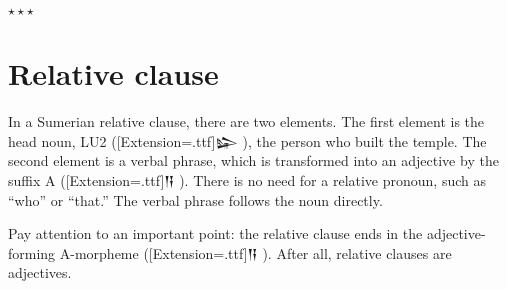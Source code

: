 \documentclass[a4paper,12pt]{book}
\newcommand*\sepstars{%
  \begin{center}
    $\star\star\star$
\end{center}}
\newcommand{\fcn}{\setmainfont{Akkadian}[Extension=.ttf]}
\begin{document}
\sepstars

\section{Relative clause}
In a Sumerian relative clause,
there are two elements. The first element
is the head noun, LU2 ({\fcn 𒇽} ),
the person who built the temple.
The second element is a verbal phrase,
which is transformed into an adjective
by the suffix A ({\fcn 𒀀} ). There is
no need for a relative pronoun,
such as ``who'' or ``that.''
The verbal phrase follows the noun directly.

Pay attention to an important point:
the relative clause ends
in the adjective-forming A-morpheme ({\fcn 𒀀} ).
After all, relative clauses are adjectives.


\printindex
\end{document}

